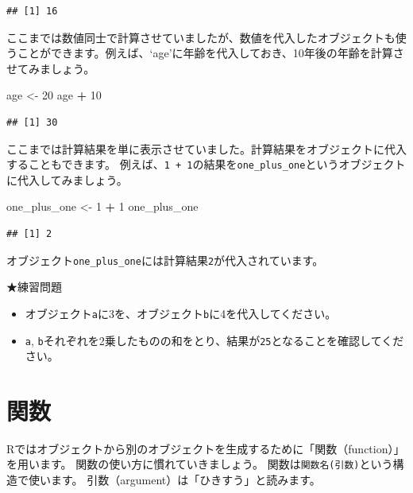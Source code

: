 \documentclass[]{book}
\newenvironment{Shaded}{\begin{snugshade}}{\end{snugshade}}
\newcommand{\DecValTok}[1]{\textcolor[rgb]{0.00,0.00,0.81}{#1}}
\newcommand{\StringTok}[1]{\textcolor[rgb]{0.31,0.60,0.02}{#1}}
\newcommand{\OperatorTok}[1]{\textcolor[rgb]{0.81,0.36,0.00}{\textbf{#1}}}
\newcommand{\NormalTok}[1]{#1}
\providecommand{\tightlist}{%
  \setlength{\itemsep}{0pt}\setlength{\parskip}{0pt}}
\begin{document}
\begin{verbatim}
## [1] 16
\end{verbatim}

ここまでは数値同士で計算させていましたが、数値を代入したオブジェクトも使うことができます。例えば、`age'に年齢を代入しておき、10年後の年齢を計算させてみましょう。

\begin{Shaded}
\begin{Highlighting}[]
\NormalTok{age <-}\StringTok{ }\DecValTok{20}
\NormalTok{age }\OperatorTok{+}\StringTok{ }\DecValTok{10}
\end{Highlighting}
\end{Shaded}

\begin{verbatim}
## [1] 30
\end{verbatim}

ここまでは計算結果を単に表示させていました。計算結果をオブジェクトに代入することもできます。
例えば、\texttt{1\ +\ 1}の結果を\texttt{one\_plus\_one}というオブジェクトに代入してみましょう。

\begin{Shaded}
\begin{Highlighting}[]
\NormalTok{one_plus_one <-}\StringTok{ }\DecValTok{1} \OperatorTok{+}\StringTok{ }\DecValTok{1}
\NormalTok{one_plus_one}
\end{Highlighting}
\end{Shaded}

\begin{verbatim}
## [1] 2
\end{verbatim}

オブジェクト\texttt{one\_plus\_one}には計算結果\texttt{2}が代入されています。

★練習問題

\begin{itemize}
\tightlist
\item
  オブジェクト\texttt{a}に3を、オブジェクト\texttt{b}に4を代入してください。
\item
  \texttt{a},
  \texttt{b}それぞれを2乗したものの和をとり、結果が\texttt{25}となることを確認してください。
\end{itemize}

\section{関数}\label{ux95a2ux6570}

Rではオブジェクトから別のオブジェクトを生成するために「関数（function）」を用います。
関数の使い方に慣れていきましょう。
関数は\texttt{関数名(引数)}という構造で使います。
引数（argument）は「ひきすう」と読みます。
\end{document}
